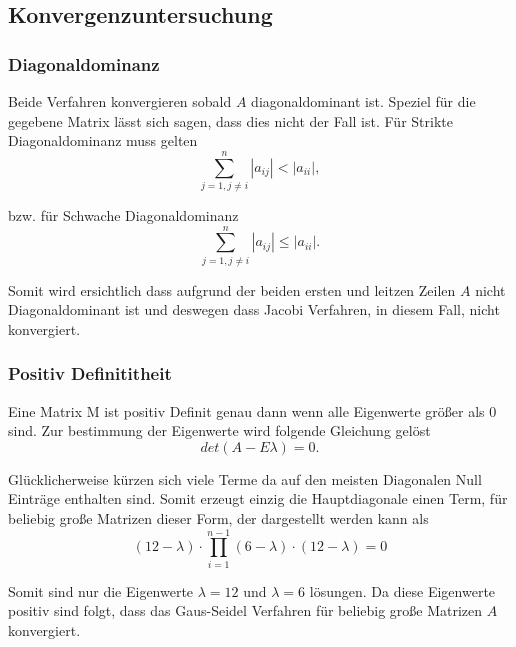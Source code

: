 \documentclass[12pt,titlepage]{article}
\begin{document}
	\subsection{Konvergenzuntersuchung}
		
		\subsubsection{Diagonaldominanz}
			Beide Verfahren konvergieren sobald $A$ diagonaldominant ist. Speziel
			für die gegebene Matrix lässt sich sagen, dass dies nicht der Fall ist.
			Für Strikte Diagonaldominanz muss gelten
			\begin{equation*}
				\sum_{j = 1, j \neq i}^{n} |a_{ij}| < |a_{ii}|,
			\end{equation*}
		
			bzw. für Schwache Diagonaldominanz
			\begin{equation*}
				\sum_{j = 1, j \neq i}^{n} |a_{ij}| \leq |a_{ii}|.
			\end{equation*}
		
			Somit wird ersichtlich dass aufgrund der beiden ersten und leitzen Zeilen
			$A$ nicht Diagonaldominant ist und deswegen dass Jacobi Verfahren, in diesem Fall, nicht
			konvergiert.

		\subsubsection{Positiv Definititheit}
		
			Eine Matrix M ist positiv Definit genau dann wenn alle Eigenwerte größer als $0$ sind. Zur bestimmung der Eigenwerte wird folgende Gleichung gelöst
			\begin{equation*}
				det(A - E\lambda) = 0.
			\end{equation*}
			
			Glücklicherweise kürzen sich viele Terme da auf den meisten Diagonalen Null Einträge enthalten sind. Somit erzeugt einzig die Hauptdiagonale einen Term, für beliebig große Matrizen dieser Form,
			der dargestellt werden kann als
			\begin{equation*}
				(12-\lambda)\cdot\prod_{i=1}^{n-1}(6-\lambda) \cdot (12-\lambda) = 0 
			\end{equation*}
			
			Somit sind nur die Eigenwerte $\lambda = 12$ und $\lambda = 6$ lösungen. Da diese Eigenwerte positiv sind folgt, dass das Gaus-Seidel Verfahren für beliebig große Matrizen $A$ konvergiert.
			
\end{document}
